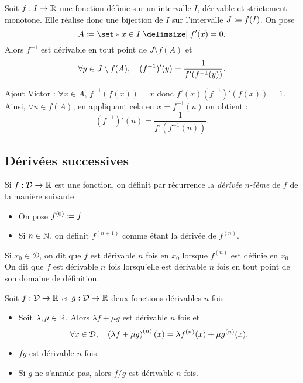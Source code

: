 \documentclass{magnoliaold}
\begin{document}
\begin{proposition}
Soit $f:I\to\mathbb{R}$ une fonction définie sur un intervalle $I$, dérivable et strictement monotone.
Elle réalise donc une bijection de $I$ sur l'intervalle $J\coloneqq f(I)$. On pose
\[A\defeq\enstq{x\in I}{f'(x)= 0}.\]
Alors $f^{-1}$ est dérivable en tout point de $J\setminus f(A)$ et
\[\forall y\in J\setminus f(A),\quad (f^{-1})'(y)=\frac{1}{f'(f^{-1}(y))}.\]
\end{proposition}
\begin{sol}
Ajout Victor : $\forall x \in A$, $f^{-1}(f(x))=x$ donc $f'(x)(f^{-1})'(f(x))=1$. Ainsi, $\forall u \in f(A)$, en appliquant cela en $x=f^{-1}(u)$ on obtient :
\[(f^{-1})'(u)=\frac{1}{f'(f^{-1}(u))}.\]
\end{sol}

\subsection{Dérivées successives}


\begin{definition}[utile=-3]
Si $f:\mathcal{D}\to\mathbb{R}$ est une fonction, on définit par récurrence
la \emph{dérivée $n$-ième} de $f$ de la manière suivante
\begin{itemize}
\item On pose $f^{(0)}\coloneqq f$.
\item Si $n\in\mathbb{N}$, on définit $f^{(n+1)}$ comme étant la dérivée de $f^{(n)}$.
\end{itemize}
Si $x_0\in\mathcal{D}$, on dit que $f$ est dérivable $n$ fois en $x_0$
lorsque $f^{(n)}$ est définie en $x_0$. On dit que $f$ est dérivable $n$ fois lorsqu'elle
est dérivable $n$ fois en tout point de son domaine de définition.
\end{definition}
 
\begin{proposition}[utile=-3]
Soit $f:\mathcal{D}\to\mathbb{R}$ et $g:\mathcal{D}\to\mathbb{R}$ deux fonctions dérivables $n$ fois.
\begin{itemize}
\item Soit $\lambda,\mu\in\mathbb{R}$. Alors $\lambda f+\mu g$ est dérivable $n$
  fois et
  \[\forall x\in\mathcal{D} ,\quad
    \left(\lambda f+\mu g\right)^{(n)}(x)=\lambda f^{(n)}(x)+\mu g^{(n)}(x).\]
\item $fg$ est dérivable $n$ fois.
\item Si $g$ ne s'annule pas, alors $f/g$ est dérivable $n$ fois.
\end{itemize}
\end{proposition}
\end{document}
